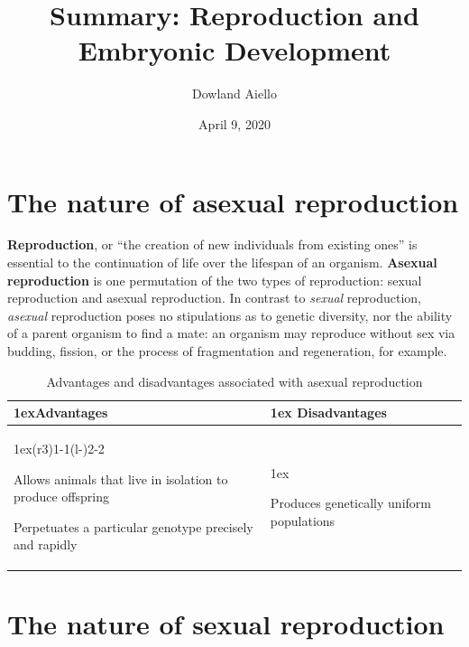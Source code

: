\documentclass{article}
\begin{document}
\title{Summary: Reproduction and Embryonic Development}
\author{Dowland Aiello}
\date{April 9, 2020}

\maketitle
\tableofcontents
\fancyhf{}

\newpage

\section{The nature of asexual reproduction}

\textbf{Reproduction}, or ``the creation of new individuals from existing ones''
is essential to the continuation of life over the lifespan of an organism.
\textbf{Asexual reproduction} is one permutation of the two types of reproduction:
sexual reproduction and asexual reproduction. In contrast to \emph{sexual} reproduction,
\emph{asexual} reproduction poses no stipulations as to genetic diversity, nor
the ability of a parent organism to find a mate: an organism may reproduce without
sex via budding, fission, or the process of fragmentation and regeneration, for
example.

\bigbreak{}

\begin{table}[h]
	\begin{tabularx}{\linewidth}{>{\parskip1ex}X@{\kern4\tabcolsep}>{\parskip1ex}X}
	\toprule
	\hfil\bfseries Advantages
	&
	\hfil\bfseries Disadvantages
	\\\cmidrule(r{3\tabcolsep}){1-1}\cmidrule(l{-\tabcolsep}){2-2}

	Allows animals that live in isolation to produce offspring\par
	Perpetuates a particular genotype precisely and rapidly\par

	&

	Produces genetically uniform populations\par

	\\\bottomrule
	\end{tabularx}
	\caption{Advantages and disadvantages associated with asexual reproduction}
\end{table}

\section{The nature of sexual reproduction}
\end{document}
